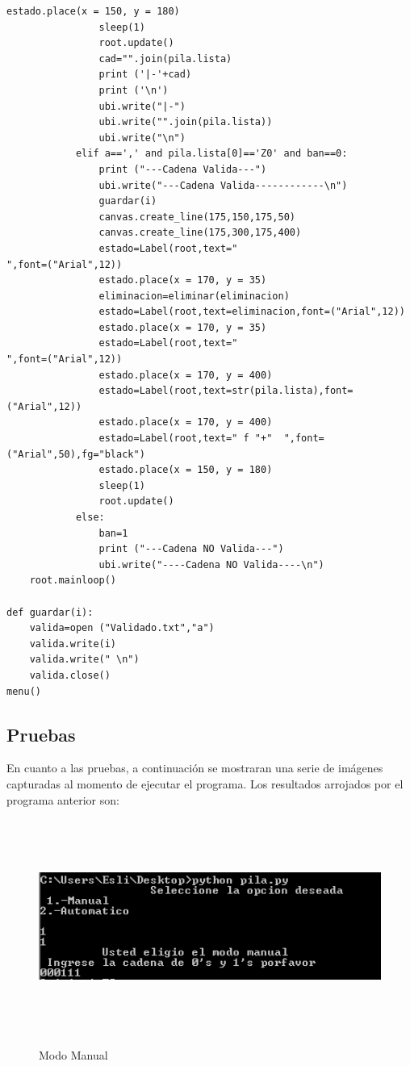 \documentclass[12pt]{article}
\begin{document}
\begin{lstlisting}[frame=single]
				estado.place(x = 150, y = 180)
				sleep(1)
				root.update()
				cad="".join(pila.lista)
				print ('|-'+cad)
				print ('\n')
				ubi.write("|-")
				ubi.write("".join(pila.lista))
				ubi.write("\n")
			elif a==',' and pila.lista[0]=='Z0' and ban==0:
				print ("---Cadena Valida---")
				ubi.write("---Cadena Valida------------\n")
				guardar(i)
				canvas.create_line(175,150,175,50)
				canvas.create_line(175,300,175,400)
				estado=Label(root,text="                                                                      ",font=("Arial",12))
				estado.place(x = 170, y = 35)
				eliminacion=eliminar(eliminacion)
				estado=Label(root,text=eliminacion,font=("Arial",12))
				estado.place(x = 170, y = 35)
				estado=Label(root,text="                                                                      ",font=("Arial",12))
				estado.place(x = 170, y = 400)
				estado=Label(root,text=str(pila.lista),font=("Arial",12))
				estado.place(x = 170, y = 400)
				estado=Label(root,text=" f "+"  ",font=("Arial",50),fg="black")
				estado.place(x = 150, y = 180)
				sleep(1)
				root.update()
			else:
				ban=1
				print ("---Cadena NO Valida---")
				ubi.write("----Cadena NO Valida----\n")
	root.mainloop()

def guardar(i):
	valida=open ("Validado.txt","a")
	valida.write(i)
	valida.write(" \n")
	valida.close()
menu()

\end{lstlisting}

\subsection{Pruebas}
En cuanto a las pruebas, a continuación se mostraran una serie de imágenes capturadas al momento de ejecutar el programa. Los resultados arrojados por el programa anterior son:


\begin{figure}[H]
\includegraphics[width=\textwidth, height=7cm]{manual_pila}
\label{fig:manual_afn}
\caption{Modo Manual}
\end{figure}
\end{document}

